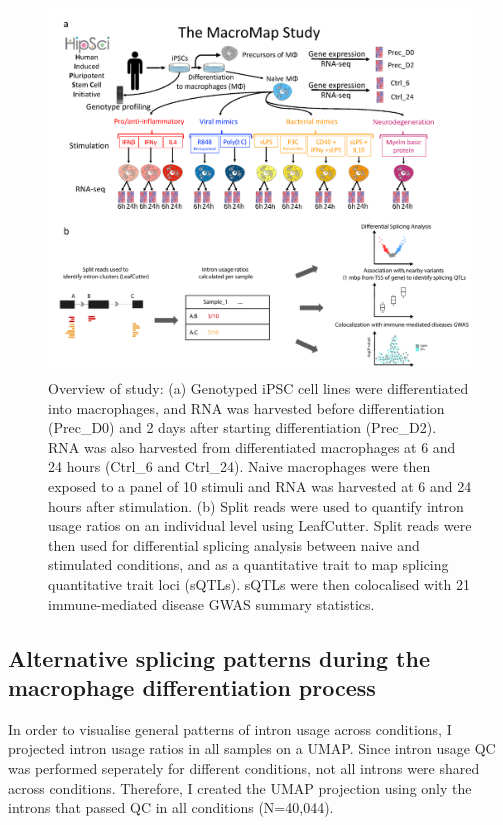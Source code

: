 \begin{figure}[H]
  \centering
  \includegraphics[width=\textwidth]{study_desc}
  \caption{Overview of study: (a) Genotyped iPSC cell lines were differentiated into macrophages, and RNA was harvested before differentiation (Prec\_D0) and 2 days after starting differentiation (Prec\_D2). RNA was also harvested from differentiated macrophages at 6 and 24 hours (Ctrl\_6 and Ctrl\_24). Naive macrophages were then exposed to a panel of 10 stimuli and RNA was harvested at 6 and 24 hours after stimulation. (b) Split reads were used to quantify intron usage ratios on an individual level using LeafCutter. Split reads were then used for differential splicing analysis between naive and stimulated conditions, and as a quantitative trait to map splicing quantitative trait loci (sQTLs). sQTLs were then colocalised with 21 immune-mediated disease GWAS summary statistics.}
  \label{fig:study_desc}   
\end{figure}


\subsection{Alternative splicing patterns during the macrophage differentiation process}
In order to visualise general patterns of intron usage across conditions, I projected intron usage ratios in all samples on a UMAP. Since intron usage QC was performed seperately for different conditions, not all introns were shared across conditions. Therefore, I created the UMAP projection using only the introns that passed QC in all conditions (N=40,044).\\

